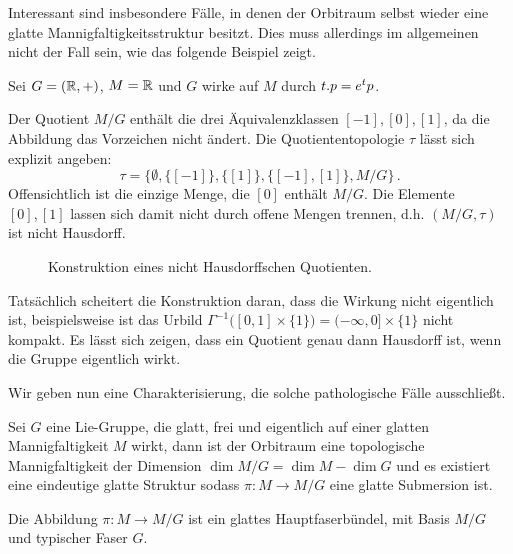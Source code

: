 Interessant sind insbesondere Fälle, in denen der Orbitraum selbst wieder eine
glatte Mannigfaltigkeitsstruktur besitzt. Dies muss allerdings im allgemeinen
nicht der Fall sein, wie das folgende Beispiel zeigt.
\begin{beispiel} Sei $G=(\mathbb{R},+)$, $M=\mathbb{R}$ und $G$ wirke auf
$M$ durch $t . p=e^tp$.

Der Quotient $M/G$ enthält die drei Äquivalenzklassen $[-1],[0],[1]$, da die
Abbildung das Vorzeichen nicht ändert.
Die Quotiententopologie $\tau$ lässt sich explizit angeben:
\begin{equation}
\tau =\big\{\emptyset,\{[-1]\},\{[1]\},\{[-1],[1]\},M/G\big\}\,.
\end{equation}
Offensichtlich ist die einzige Menge, die $[0]$ enthält $M/G$. Die Elemente
$[0],[1]$ lassen sich damit nicht durch offene Mengen trennen, d.h. $(M/G,\tau)$
ist nicht Hausdorff.
\begin{figure}[!htbp]
\centering
{}
\caption{Konstruktion eines nicht Hausdorffschen Quotienten.}
\end{figure}
\end{beispiel}
Tatsächlich scheitert die Konstruktion daran, dass die Wirkung nicht eigentlich
ist, beispielsweise ist das Urbild $\Gamma^{-1}\big([0,1]\times
\{1\}\big)=(-\infty,0]\times \{1\}$ nicht kompakt.
Es lässt sich zeigen, dass ein Quotient genau dann Hausdorff ist, wenn die
Gruppe eigentlich wirkt. %

Wir geben nun eine Charakterisierung, die solche pathologische
Fälle ausschließt.
\begin{theorem}
Sei $G$ eine Lie-Gruppe, die glatt, frei und eigentlich auf einer glatten
Mannigfaltigkeit $M$ wirkt, dann ist der Orbitraum eine topologische
Mannigfaltigkeit der Dimension $\dim M/G=\dim M -\dim G$ und es existiert eine
eindeutige glatte Struktur sodass $\pi:M\to  M/G$ eine glatte Submersion ist.
\end{theorem}
\begin{bemerkung}
Die Abbildung $\pi:M\to M/G$ ist ein glattes Hauptfaserbündel,
mit Basis $M/G$ und typischer Faser $G$.
\end{bemerkung}
